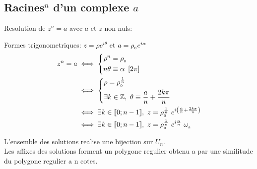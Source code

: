 \documentclass[12pt,a4paper]{article}
\begin{document}
		\subsection{Racines$^n$ d'un complexe $a$}
			Resolution de $z^n=a$ avec $a$ et $z$ non nuls:\\
			\begin{tab}
				Formes trigonometriques: $z=\rho e^{i\theta}$ et $a=\rho_{_{0}}e^{i\alpha}$
				$$\begin{aligned}
					z^n=a&\iff \systeme{\rho^n&=\rho\uu0\\ n\theta&\equiv\alpha\ \left[2\pi\right]}\\
					&\iff\systeme{&\rho=\rho\uu0^{\frac{1}{n}}\\&\exists k\in\mathbb{Z},\ \theta\equiv\frac{a}{n}+\frac{2k\pi}{n}}\\
					&\iff\exists k\in\lbracket0;n-1\rbracket,\ z=\rho\uu0^\frac{1}{n}\ e^{i\left(\frac{\alpha}{n}+\frac{2k\pi}{n}\right)} \\
					&\iff\exists k\in\lbracket0;n-1\rbracket,\ z=\rho\uu0^\frac{1}{n}\ e^{i\frac{\alpha}{n}}\ \omega\uu{k}
				\end{aligned}$$
			\end{tab}
			L'ensemble des solutions realise une bijection sur $U_n$.\\
			Les affixes des solutions forment un polygone regulier obtenu a par une similitude du polygone regulier a n cotes.
			
\end{document}
